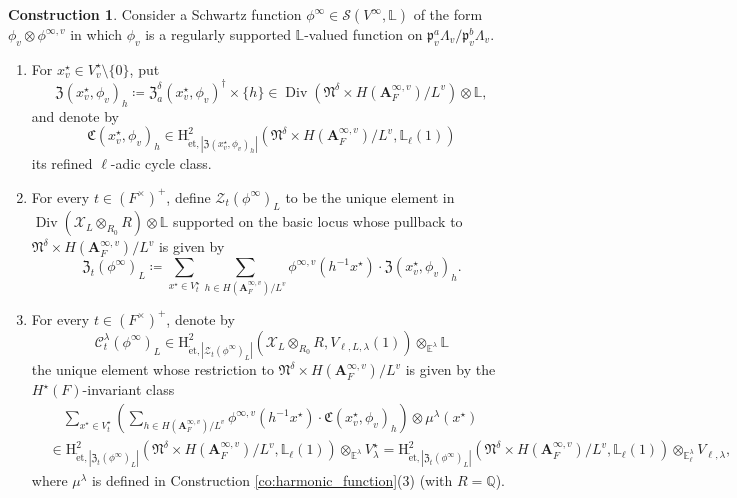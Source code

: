 \documentclass[12pt]{amsart}
\numberwithin{equation}{section}
\theoremstyle{plain}
\theoremstyle{definition}
\newtheorem{construction}[proposition]{Construction}
\theoremstyle{remark}
\renewcommand{\b}[1]{\mathbf{#1}}
\renewcommand{\c}[1]{\mathcal{#1}}
\renewcommand{\d}[1]{\mathbb{#1}}
\newcommand{\f}[1]{\mathfrak{#1}}
\renewcommand{\r}[1]{\mathrm{#1}}
\newcommand{\s}[1]{\mathscr{#1}}
\renewcommand{\(}{\left(}
\renewcommand{\)}{\right)}
\newcommand{\bA}{\b A}
\newcommand{\cC}{\c C}
\newcommand{\cX}{\c X}
\newcommand{\cZ}{\c Z}
\newcommand{\dE}{\d E}
\newcommand{\dL}{\d L}
\newcommand{\dQ}{\d Q}
\newcommand{\fC}{\f C}
\newcommand{\fN}{\f N}
\newcommand{\fZ}{\f Z}
\newcommand{\fp}{\f p}
\newcommand{\rH}{\r H}
\newcommand{\sS}{\s S}
\newcommand{\et}{{\acute{\r{e}}\r{t}}}
\DeclareMathOperator{\Div}{Div}
\begin{document}
\begin{construction}\label{co:special_divisor_split}
Consider a Schwartz function $\phi^\infty\in\sS(V^\infty,\dL)$ of the form $\phi_v\otimes\phi^{\infty,v}$ in which $\phi_v$ is a regularly supported $\dL$-valued function on $\fp_v^a\Lambda_v/\fp_v^b\Lambda_v$.
\begin{enumerate}
  \item For $x^\star_v\in V^\star_v\setminus\{0\}$, put
      \[
      \fZ(x^\star_v,\phi_v)_h\coloneqq
      \fZ_a^\delta(x^\star_v,\phi_v)^\dag\times\{h\}\in\Div(\fN^\delta\times H(\bA_F^{\infty,v})/L^v)\otimes\dL,
      \]
      and denote by
      \[
      \fC(x^\star_v,\phi_v)_h\in\rH^2_{\et,|\fZ(x^\star_v,\phi_v)_h|}(\fN^\delta\times H(\bA_F^{\infty,v})/L^v,\dL_\ell(1))
      \]
      its refined $\ell$-adic cycle class.

  \item For every $t\in(F^\times)^+$, define $\cZ_t(\phi^\infty)_L$ to be the unique element in $\Div(\cX_L\otimes_{R_0}R)\otimes\dL$ supported on the basic locus whose pullback to $\fN^\delta\times H(\bA_F^{\infty,v})/L^v$ is given by
      \[
      \fZ_t(\phi^\infty)_L\coloneqq\sum_{x^\star\in V^\star_t}\sum_{h\in H(\bA_F^{\infty,v})/L^v}
      \phi^{\infty,v}(h^{-1}x^\star)\cdot\fZ(x^\star_v,\phi_v)_h.
      \]

  \item For every $t\in(F^\times)^+$, denote by
      \[
      \cC^\lambda_t(\phi^\infty)_L\in
      \rH^2_{\et,|\cZ_t(\phi^\infty)_L|}(\cX_L\otimes_{R_0}R,V_{\ell,L,\lambda}(1))\otimes_{\dE^\lambda}\dL
      \]
      the unique element whose restriction to $\fN^\delta\times H(\bA_F^{\infty,v})/L^v$ is given by the $H^\star(F)$-invariant class
      \begin{align*}
      &\quad\sum_{x^\star\in V^\star_t}\(\sum_{h\in H(\bA_F^{\infty,v})/L^v}
      \phi^{\infty,v}(h^{-1}x^\star)\cdot\fC(x^\star_v,\phi_v)_h\)\otimes\mu^\lambda(x^\star) \\
      &\in\rH^2_{\et,|\fZ_t(\phi^\infty)_L|}(\fN^\delta\times H(\bA_F^{\infty,v})/L^v,\dL_\ell(1))
      \otimes_{\dE^\lambda}V^\star_\lambda
      =\rH^2_{\et,|\fZ_t(\phi^\infty)_L|}(\fN^\delta\times H(\bA_F^{\infty,v})/L^v,\dL_\ell(1))
      \otimes_{\dE^\lambda_\ell}V_{\ell,\lambda},
      \end{align*}
      where $\mu^\lambda$ is defined in Construction \ref{co:harmonic_function}(3) (with $R=\dQ$).
\end{enumerate}
\end{construction}
\end{document}
